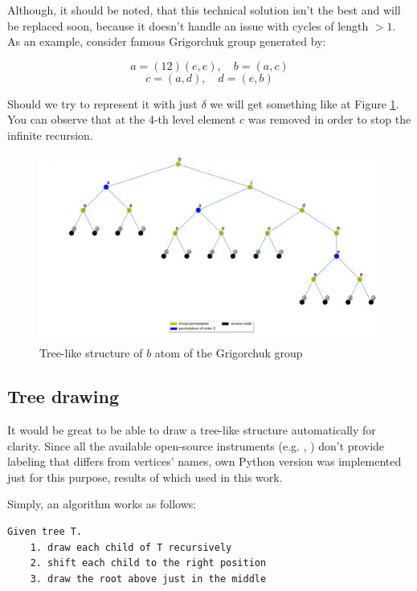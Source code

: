 \documentclass[a4paper,12pt]{amsart}
\begin{document}
Although, it should be noted, that this technical solution isn't the best and will be replaced soon, because it doesn't handle an issue with cycles of length $>1$. As an example, consider famous Grigorchuk group generated by: 


$$a = (12)(e, e), \quad b = (a, c)$$
$$c = (a, d), \quad d = (e, b)$$  

Should we try to represent it with just $\delta$ we will get something like at Figure \ref{grigorchuk}. You can observe that at the 4-th level element $c$ was removed in order to stop the infinite recursion. 

\begin{figure}[h]	
	\includegraphics[scale=0.4]{grigorchuk.png}
	\caption{Tree-like structure of $b$ atom of the Grigorchuk group}
	\label{grigorchuk}
\end{figure}


\subsection{Tree drawing}

It would be great to be able to draw a tree-like structure automatically for clarity. Since all the available open-source instruments (e.g. \cite{NetworkX}, \cite{Sage-graphs}) don't provide labeling that differs from vertices' names,  own Python version was implemented just for this purpose, results of which used in this work. 


Simply, an algorithm works as follows: 

\begin{lstlisting}
Given tree T. 
    1. draw each child of T recursively 
    2. shift each child to the right position 
    3. draw the root above just in the middle 
\end{lstlisting}
\end{document}
